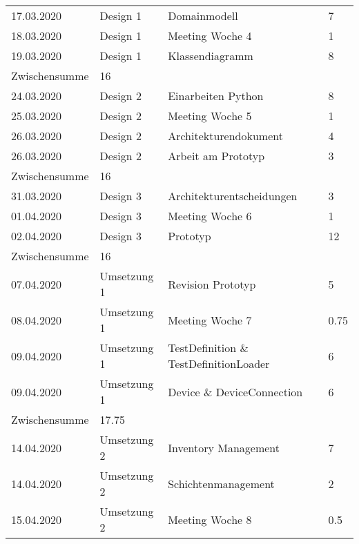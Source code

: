 \documentclass[
	ngerman,
	toc=listof, %
	toc=bibliography, %
	footnotes=multiple, %
	parskip=half, %
	numbers=noendperiod %
]{scrartcl}
\begin{document}
	\begin{tabularx}{\textwidth}{llXl}
		\toprule
		17.03.2020 & Design 1 & Domainmodell & 7 \\
		18.03.2020 & Design 1 & Meeting Woche 4 & 1 \\
		19.03.2020 & Design 1 & Klassendiagramm & 8 \\
		\midrule
		Zwischensumme & 16 & & \\
		\midrule
		24.03.2020 & Design 2 & Einarbeiten Python & 8 \\
		25.03.2020 & Design 2 & Meeting Woche 5 & 1 \\
		26.03.2020 & Design 2 & Architekturendokument & 4 \\
		26.03.2020 & Design 2 & Arbeit am Prototyp & 3 \\
		\midrule
		Zwischensumme & 16 & & \\
		\midrule
		31.03.2020 & Design 3 & Architekturentscheidungen & 3 \\
		01.04.2020 & Design 3 & Meeting Woche 6 & 1 \\
		02.04.2020 & Design 3 & Prototyp & 12 \\
		\midrule
		Zwischensumme & 16 & & \\
		\midrule
		07.04.2020 & Umsetzung 1 & Revision Prototyp & 5 \\
		08.04.2020 & Umsetzung 1 & Meeting Woche 7 & 0.75 \\
		09.04.2020 & Umsetzung 1 & TestDefinition \& TestDefinitionLoader & 6 \\
		09.04.2020 & Umsetzung 1 & Device \& DeviceConnection & 6 \\
		\midrule
		Zwischensumme & 17.75 & & \\
		\midrule
		14.04.2020 & Umsetzung 2 & Inventory Management & 7 \\
		14.04.2020 & Umsetzung 2 & Schichtenmanagement & 2 \\
		15.04.2020 & Umsetzung 2 & Meeting Woche 8 & 0.5 \\
		\bottomrule
	\end{tabularx}
\end{document}
